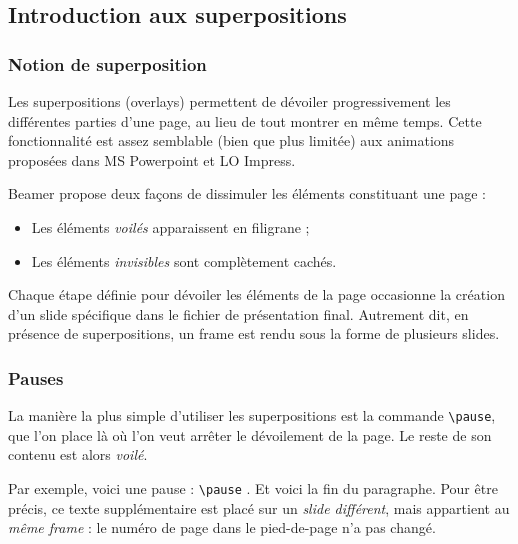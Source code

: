 \documentclass[10pt,    %
    french,             %
    xcolor=table,       %
    envcountsect,       %
    aspectratio=43      %
]{beamer}
\begin{document}
\subsection{Introduction aux superpositions}
\begin{frame}
    \frametitle{Notion de superposition}
    
    Les superpositions (overlays) permettent de dévoiler progressivement les différentes parties d'une page, au lieu de tout montrer en même temps. Cette fonctionnalité est assez semblable (bien que plus limitée) aux animations proposées dans MS Powerpoint et LO Impress.
    
    \medskip
    Beamer propose deux façons de dissimuler les éléments constituant une page : 
    \begin{itemize}
        \item Les éléments \textit{voilés} apparaissent en filigrane ;
        \item Les éléments \textit{invisibles} sont complètement cachés.
    \end{itemize}
    
    \medskip
    Chaque étape définie pour dévoiler les éléments de la page occasionne la création d'un slide spécifique dans le fichier de présentation final. Autrement dit, en présence de superpositions, un frame est rendu sous la forme de plusieurs slides.
    
\end{frame}

\begin{frame}
    \frametitle{Pauses}
    
    La manière la plus simple d'utiliser les superpositions est la commande \texttt{\textbackslash{}pause}, que l'on place là où l'on veut arrêter le dévoilement de la page. Le reste de son contenu est alors \textit{voilé}.
    
    \medskip
    Par exemple, voici une pause : \texttt{\textbackslash{}pause} \pause. Et voici la fin du paragraphe. Pour être précis, ce texte supplémentaire est placé sur un \textit{slide différent}, mais appartient au \textit{même frame} : le numéro de page dans le pied-de-page n'a pas changé.
    
    \medskip
\end{frame}
\end{document}

